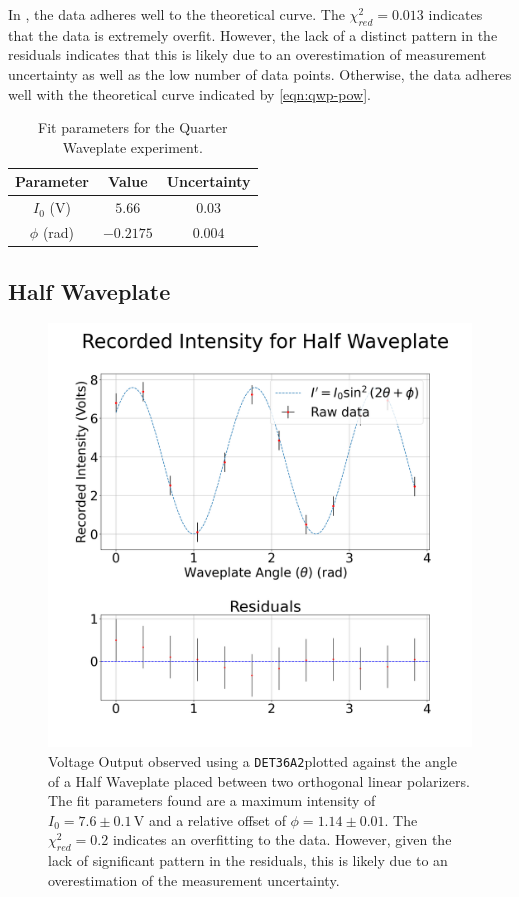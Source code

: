 \documentclass[aip, cp, amsmath, amssymb, reprint]{revtex4-2}
\newcommand{\pdiode}{\texttt{DET36A2}\space}
\begin{document}
            In , the data adheres well to the theoretical curve. The $\chi_{red}^2 = 0.013$ indicates that the data is extremely overfit. However, the lack of a distinct pattern in the residuals indicates that this is likely due to an overestimation of measurement uncertainty as well as the low number of data points. Otherwise, the data adheres well with the theoretical curve indicated by \eqref{eqn:qwp-pow}.

            \begin{table}[H]
                \centering
                \begin{tabular}{c|c|c}
                    \bfseries Parameter & \bfseries Value & \bfseries Uncertainty \\
                    \hline
                    $I_0$ (V) & $5.66$ & $0.03$ \\
                    $\phi$ (rad) & $-0.2175$ & $0.004$ 
                \end{tabular}
                \caption{Fit parameters for the Quarter Waveplate experiment.}
                \label{tab:qwp}
            \end{table}

        \subsection{Half Waveplate}
            \begin{figure}[H]
                \centering
                \includegraphics[width=0.9\linewidth]{../figures/Half.png}
                \caption{Voltage Output observed using a \pdiode plotted against the angle of a Half Waveplate placed between two orthogonal linear polarizers. The fit parameters found are a maximum intensity of $I_0 = 7.6 \pm 0.1\,\text{V}$ and a relative offset of $\phi = 1.14 \pm 0.01$. The $\chi_{red}^2 = 0.2$ indicates an overfitting to the data. However, given the lack of significant pattern in the residuals, this is likely due to an overestimation of the measurement uncertainty.}
                \label{fig:part2b}
            \end{figure}
\end{document}
